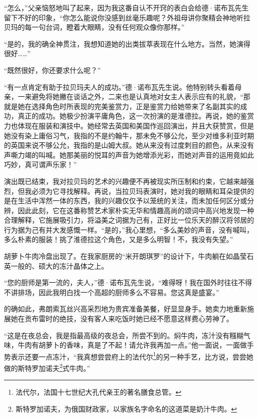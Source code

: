 \par “怎么，”父亲恼怒地叫了起来，因为我这番自认不开窍的表白会给德·诺布瓦先生留下不好的印象，“你怎么能说你没感到丝毫乐趣呢？外祖母讲你聚精会神地听拉贝玛的每一句台词，瞪着大眼睛，没有任何观众像你那样。”
\par “是的，我的确全神贯注，我想知道她的出类拔萃表现在什么地方。当然，她演得很好……”
\par “既然很好，你还要求什么呢？”
\par “有一点肯定有助于拉贝玛夫人的成功。”德·诺布瓦先生说。他特别转头看着母亲，一来避免将她撇在谈话之外，二来也是认真地对女主人表示应有的礼貌，“那就是她在选择角色时所表现的完美鉴赏力，正是鉴赏力给她带来了名副其实的成功，真正的成功。她极少扮演平庸角色，这一次扮演的是淮德拉。再说，她的鉴赏力也体现在服装和演技中。她经常去英国和美国作巡回演出，并且大获赞赏，但是她没有染上庸俗习气，我指的不是约翰牛，那未免不够公允，至少对维多利亚时期的英国来说不够公允，我指的是山姆大叔。她从来没有过度刺目的颜色，从来没有声嘶力竭的叫喊。她那美丽的悦耳的声音为她增添光彩，而她对声音的运用竟如此巧妙，真可谓声乐家！”
\par 演出既已结束，我对拉贝玛的艺术的兴趣便不再被现实所压制和约束，它越来越强烈，但我必须为它寻找解释。再说，当拉贝玛表演时，她对我的眼睛和耳朵提供的是在生活中浑然一体的东西，我的兴趣仅仅予以笼统的关注，而未加任何区分或分辨，因此此刻，它在这番称赞艺术家朴实无华和情趣高尚的颂词中高兴地发现一种合理解释，它施展吸引力，将溢美之词据为己有，正好比一位乐天的醉汉将邻居的行为据为己有并大发感慨一样。“是的，”我心里想，“多么美妙的声音，没有喊叫，多么朴素的服装！挑了淮德拉这个角色，又是多么明智！不，我没有失望。”
\par 胡萝卜牛肉冷盘出现了。在我家厨房的“米开朗琪罗”的设计下，牛肉躺在如晶莹石英一般的、硕大的冻汁晶体之上。
\par “您的厨师是第一流的，夫人，”德·诺布瓦先生说，“难得呀！我在国外时往往不得不讲排场，因此我明白找一个高超的厨师多么不容易。您这真是盛宴。”
\par 的确如此，弗朗索瓦丝兴高采烈地为贵宾准备美餐，好显显身手。她卖力地重新施展她在贡布雷时的绝技，没有客人来吃饭时她已经不愿意这样费心劳神了。
\par “这是在夜总会，我是指最高级的夜总会，所尝不到的。焖牛肉，冻汁没有糨糊气味，牛肉有胡萝卜的香味，真是了不起！请允许我再加一点。”他一面说，一面做手势表示还要一点冻汁，“我真想尝尝府上的法代尔\footnote{法代尔，法国十七世纪大孔代亲王的著名膳食总管。}的另一种手艺，比方说，尝尝她做的斯特罗加诺夫\footnote{斯特罗加诺夫，为俄国财政家，以家族名字命名的这道菜是奶汁牛肉。}式牛肉。”

